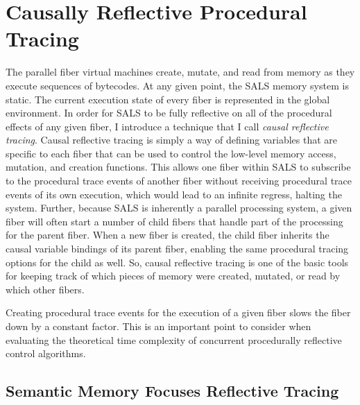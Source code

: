 \chapter{Causally Reflective Procedural Tracing}
\label{chapter:causally_reflective_procedural_tracing}

The parallel fiber virtual machines create, mutate, and read from
memory as they execute sequences of bytecodes.  At any given point,
the SALS memory system is static.  The current execution state of
every fiber is represented in the global environment.  In order for
SALS to be fully reflective on all of the procedural effects of any
given fiber, I introduce a technique that I call \emph{causal
  reflective tracing}.  Causal reflective tracing is simply a way of
defining variables that are specific to each fiber that can be used to
control the low-level memory access, mutation, and creation functions.
This allows one fiber within SALS to subscribe to the procedural trace
events of another fiber without receiving procedural trace events of
its own execution, which would lead to an infinite regress, halting
the system.  Further, because SALS is inherently a parallel processing
system, a given fiber will often start a number of child fibers that
handle part of the processing for the parent fiber.  When a new fiber
is created, the child fiber inherits the causal variable bindings of
its parent fiber, enabling the same procedural tracing options for the
child as well.  So, causal reflective tracing is one of the basic
tools for keeping track of which pieces of memory were created,
mutated, or read by which other fibers.

Creating procedural trace events for the execution of a given fiber
slows the fiber down by a constant factor.  This is an important point
to consider when evaluating the theoretical time complexity of
concurrent procedurally reflective control algorithms.

\section{Semantic Memory Focuses Reflective Tracing}

